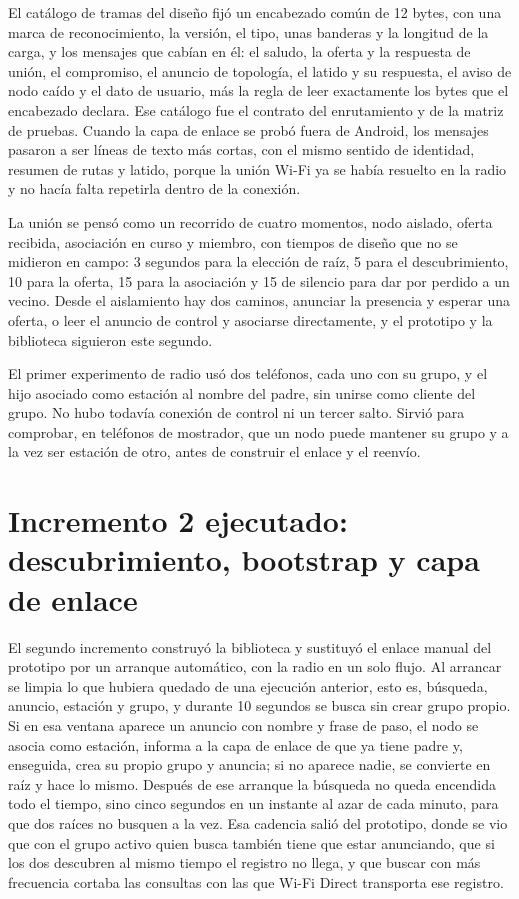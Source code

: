 \documentclass[12pt,oneside]{scrreprt}
\begin{document}
El catálogo de tramas del diseño fijó un encabezado común de 12 bytes, con una marca de reconocimiento, la versión, el tipo, unas banderas y la longitud de la carga, y los mensajes que cabían en él: el saludo, la oferta y la respuesta de unión, el compromiso, el anuncio de topología, el latido y su respuesta, el aviso de nodo caído y el dato de usuario, más la regla de leer exactamente los bytes que el encabezado declara. Ese catálogo fue el contrato del enrutamiento y de la matriz de pruebas. Cuando la capa de enlace se probó fuera de Android, los mensajes pasaron a ser líneas de texto más cortas, con el mismo sentido de identidad, resumen de rutas y latido, porque la unión Wi-Fi ya se había resuelto en la radio y no hacía falta repetirla dentro de la conexión.

La unión se pensó como un recorrido de cuatro momentos, nodo aislado, oferta recibida, asociación en curso y miembro, con tiempos de diseño que no se midieron en campo: 3 segundos para la elección de raíz, 5 para el descubrimiento, 10 para la oferta, 15 para la asociación y 15 de silencio para dar por perdido a un vecino. Desde el aislamiento hay dos caminos, anunciar la presencia y esperar una oferta, o leer el anuncio de control y asociarse directamente, y el prototipo y la biblioteca siguieron este segundo.

El primer experimento de radio usó dos teléfonos, cada uno con su grupo, y el hijo asociado como estación al nombre del padre, sin unirse como cliente del grupo. No hubo todavía conexión de control ni un tercer salto. Sirvió para comprobar, en teléfonos de mostrador, que un nodo puede mantener su grupo y a la vez ser estación de otro, antes de construir el enlace y el reenvío.

\section{Incremento 2 ejecutado: descubrimiento, bootstrap y capa de enlace}

El segundo incremento construyó la biblioteca y sustituyó el enlace manual del prototipo por un arranque automático, con la radio en un solo flujo. Al arrancar se limpia lo que hubiera quedado de una ejecución anterior, esto es, búsqueda, anuncio, estación y grupo, y durante 10 segundos se busca sin crear grupo propio. Si en esa ventana aparece un anuncio con nombre y frase de paso, el nodo se asocia como estación, informa a la capa de enlace de que ya tiene padre y, enseguida, crea su propio grupo y anuncia; si no aparece nadie, se convierte en raíz y hace lo mismo. Después de ese arranque la búsqueda no queda encendida todo el tiempo, sino cinco segundos en un instante al azar de cada minuto, para que dos raíces no busquen a la vez. Esa cadencia salió del prototipo, donde se vio que con el grupo activo quien busca también tiene que estar anunciando, que si los dos descubren al mismo tiempo el registro no llega, y que buscar con más frecuencia cortaba las consultas con las que Wi-Fi Direct transporta ese registro.
\end{document}
